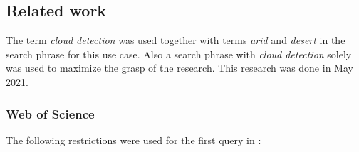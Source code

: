 

\subsection{Related work}
\label{cloud-detection-situation}

The term \textit{cloud detection} was used together with terms \textit{arid} and \textit{desert} in the search phrase for this use case. Also a search phrase with \textit{cloud detection} solely was used to maximize the grasp of the research. This research was done in May 2021.

\subsubsection{Web of Science}
\label{cloud-detection-wos}

The following restrictions were used for the first query in :

